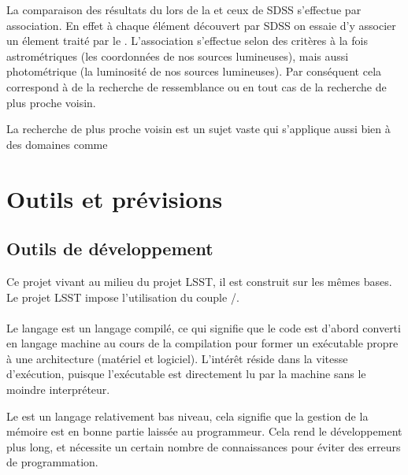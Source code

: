 La comparaison des résultats du \stack{} lors de la \DC{} et ceux de SDSS s'effectue par association. En effet à chaque élément découvert par SDSS on essaie d'y associer un élement traité par le \stack{}. L'association s'effectue selon des critères à la fois astrométriques (les coordonnées de nos sources lumineuses), mais aussi photométrique (la luminosité de nos sources lumineuses). Par conséquent cela correspond à de la recherche de ressemblance ou en tout cas de la recherche de plus proche voisin.

La recherche de plus proche voisin est un sujet vaste qui s'applique aussi bien à des domaines comme %


\section{Outils et prévisions}

	\subsection{Outils de développement}

Ce projet vivant au milieu du projet LSST, il est construit sur les mêmes bases. Le projet LSST impose l'utilisation du couple \Cpp{}/\Python{}.

			\paragraph{\Cpp}
Le langage \Cpp{} est un langage compilé, ce qui signifie que le code est d'abord converti en langage machine au cours de la compilation pour former un exécutable propre à une architecture (matériel et logiciel). L'intérêt réside dans la vitesse d'exécution, puisque l'exécutable est directement lu par la machine sans le moindre interpréteur.

Le \Cpp{} est un langage relativement bas niveau, cela signifie que la gestion de la mémoire est en bonne partie laissée au programmeur. Cela rend le développement plus long, et nécessite un certain nombre de connaissances pour éviter des erreurs de programmation.

